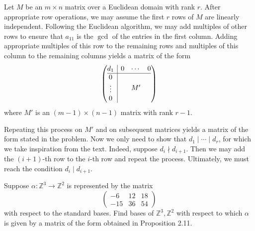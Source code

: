 \documentclass[../../master.tex]{subfiles}
\begin{document}
\begin{solution}
    Let $M$ be an $m \times n$ matrix over a Euclidean domain with rank $r$.
    After appropriate row operations, we may assume the first $r$ rows of $M$ are linearly independent.
    Following the Euclidean algorithm, we may add multiples of other rows to ensure that $a_{11}$ is the $\gcd$ of the entries in the first column.
    Adding appropriate multiples of this row to the remaining rows and multiples of this column to the remaining columns yields a matrix of the form
    \[
        \left(
            \begin{array}{@{}c|c@{}}
                d_1 &
                \begin{matrix}
                    0 & \cdots & 0
                \end{matrix} \\
                \hline
                \begin{matrix}
                    0 \\
                    \vdots \\
                    0
                \end{matrix} &
                M'
            \end{array}
        \right)
    \]
    where $M'$ is an $(m-1) \times (n-1)$ matrix with rank $r - 1$.

    Repeating this process on $M'$ and on subsequent matrices yields a matrix of the form stated in the problem. 
    Now we only need to show that $d_1 \mid \cdots \mid d_r$, for which we take inspiration from the text.
    Indeed, suppose $d_i \nmid d_{i+1}$.
    Then we may add the $(i+1)$-th row to the $i$-th row and repeat the process.
    Ultimately, we must reach the condition $d_i \mid d_{i+1}$.
\end{solution}

\begin{problem}
    Suppose $\alpha: \mathbb{Z}^3 \to \mathbb{Z}^2$ is represented by the matrix
    \[
    \begin{pmatrix}
        -6 & 12 & 18 \\
        -15 & 36 & 54
    \end{pmatrix}
    \]
    with respect to the standard bases.
    Find bases of $\mathbb{Z}^3, \mathbb{Z}^2$ with respect to which $\alpha$ is given by a matrix of the form obtained in Proposition 2.11.
\end{problem}
\end{document}
